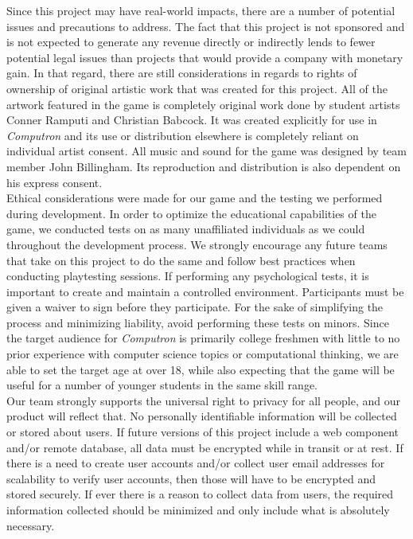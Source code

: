 Since this project may have real-world impacts, there are a number of potential issues and precautions to address. The fact that this project is not sponsored and is not expected to generate any revenue directly or indirectly lends to fewer potential legal issues than projects that would provide a company with monetary gain. In that regard, there are still considerations in regards to rights of ownership of original artistic work that was created for this project. All of the artwork featured in the game is completely original work done by student artists Conner Ramputi and Christian Babcock. It was created explicitly for use in \textit{Computron} and its use or distribution elsewhere is completely reliant on individual artist consent. All music and sound for the game was designed by team member John Billingham. Its reproduction and distribution is also dependent on his express consent.\\

Ethical considerations were made for our game and the testing we performed during development. In order to optimize the educational capabilities of the game, we conducted tests on as many unaffiliated individuals as we could throughout the development process. We strongly encourage any future teams that take on this project to do the same and follow best practices when conducting playtesting sessions. If performing any psychological tests, it is important to create and maintain a controlled environment. Participants must be  given a waiver to sign before they participate. For the sake of simplifying the process and minimizing liability, avoid performing these tests on minors. Since the target audience for \textit{Computron} is primarily college freshmen with little to no prior experience with computer science topics or computational thinking, we are able to set the target age at over 18, while also expecting that the game will be useful for a number of younger students in the same skill range.\\

Our team strongly supports the universal right to privacy for all people, and our product will reflect that. No personally identifiable information will be collected or stored about users. If future versions of this project include a web component and/or remote database, all data must be encrypted while in transit or at rest. If there is a need to create user accounts and/or collect user email addresses for scalability to verify user accounts, then those will have to be encrypted and stored securely. If ever there is a reason to collect data from users, the required information collected should be minimized and only include what is absolutely necessary.